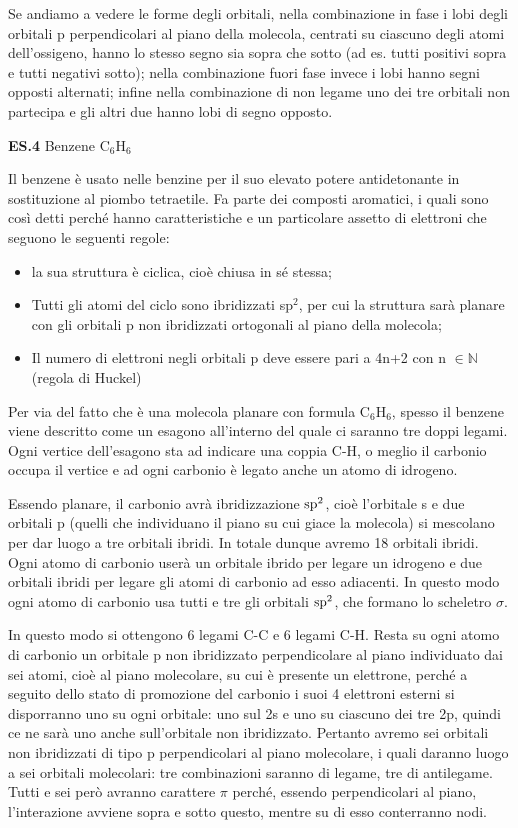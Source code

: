 Se andiamo a vedere le forme degli orbitali, nella combinazione in fase i lobi degli orbitali p perpendicolari al piano della molecola, centrati su ciascuno degli atomi dell'ossigeno, hanno lo stesso segno sia sopra che sotto (ad es. tutti positivi sopra e tutti negativi sotto); nella combinazione fuori fase invece i lobi hanno segni opposti alternati; infine nella combinazione di non legame uno dei tre orbitali non partecipa e gli altri due hanno lobi di segno opposto.

\vspace{0.2cm}\textbf{ES.4} Benzene C$_6$H$_6$

Il benzene è usato nelle benzine per il suo elevato potere antidetonante in sostituzione al piombo tetraetile. Fa parte dei composti aromatici, i quali sono così detti perché hanno caratteristiche e un particolare assetto di elettroni che seguono le seguenti regole:

\begin{itemize}
    \item la sua struttura è ciclica, cioè chiusa in sé stessa;
    \item Tutti gli atomi del ciclo sono ibridizzati sp$^2$, per cui la struttura sarà planare con gli orbitali p non ibridizzati ortogonali al piano della molecola;
    \item Il numero di elettroni negli orbitali p deve essere pari a 4n+2 con n $\in \mathbb{N}$ (regola di Huckel)
\end{itemize}

Per via del fatto che è una molecola planare con formula C$_6$H$_6$, spesso il benzene viene descritto come un esagono all'interno del quale ci saranno tre doppi legami. Ogni vertice dell'esagono sta ad indicare una coppia C-H, o meglio il carbonio occupa il vertice e ad ogni carbonio è legato anche un atomo di idrogeno.

Essendo planare, il carbonio avrà ibridizzazione $\rm sp^2$, cioè l'orbitale s e due orbitali p (quelli che individuano il piano su cui giace la molecola) si mescolano per dar luogo a tre orbitali ibridi. In totale dunque avremo 18 orbitali ibridi. Ogni atomo di carbonio userà un orbitale ibrido per legare un idrogeno e due orbitali ibridi per legare gli atomi di carbonio ad esso adiacenti. In questo modo ogni atomo di carbonio usa tutti e tre gli orbitali $\rm sp^2$, che formano lo scheletro $\sigma$.

In questo modo si ottengono 6 legami C-C e 6 legami C-H. Resta su ogni atomo di carbonio un orbitale p non ibridizzato perpendicolare al piano individuato dai sei atomi, cioè al piano molecolare, su cui è presente un elettrone, perché a seguito dello stato di promozione del carbonio i suoi 4 elettroni esterni si disporranno uno su ogni orbitale: uno sul 2s e uno su ciascuno dei tre 2p, quindi ce ne sarà uno anche sull'orbitale non ibridizzato. Pertanto avremo sei orbitali non ibridizzati di tipo p perpendicolari al piano molecolare, i quali daranno luogo a sei orbitali molecolari: tre combinazioni saranno di legame, tre di antilegame. Tutti e sei però avranno carattere $\pi$ perché, essendo perpendicolari al piano, l'interazione avviene sopra e sotto questo, mentre su di esso conterranno nodi.

